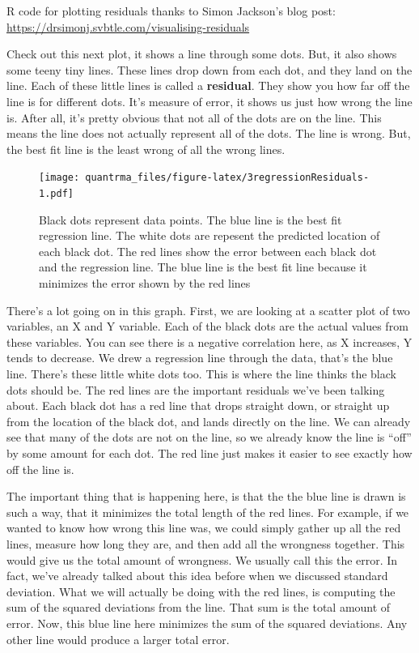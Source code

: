 \documentclass[
]{book}
\begin{document}
\begin{marginnote}

R code for plotting residuals thanks to Simon Jackson's blog post: \url{https://drsimonj.svbtle.com/visualising-residuals}

\end{marginnote}

Check out this next plot, it shows a line through some dots. But, it also shows some teeny tiny lines. These lines drop down from each dot, and they land on the line. Each of these little lines is called a \textbf{residual}. They show you how far off the line is for different dots. It's measure of error, it shows us just how wrong the line is. After all, it's pretty obvious that not all of the dots are on the line. This means the line does not actually represent all of the dots. The line is wrong. But, the best fit line is the least wrong of all the wrong lines.

\begin{figure}
\centering
\texttt{[image: quantrma\_files/figure-latex/3regressionResiduals-1.pdf]}
\caption{\label{fig:3regressionResiduals}Black dots represent data points. The blue line is the best fit regression line. The white dots are repesent the predicted location of each black dot. The red lines show the error between each black dot and the regression line. The blue line is the best fit line because it minimizes the error shown by the red lines}
\end{figure}

There's a lot going on in this graph. First, we are looking at a scatter plot of two variables, an X and Y variable. Each of the black dots are the actual values from these variables. You can see there is a negative correlation here, as X increases, Y tends to decrease. We drew a regression line through the data, that's the blue line. There's these little white dots too. This is where the line thinks the black dots should be. The red lines are the important residuals we've been talking about. Each black dot has a red line that drops straight down, or straight up from the location of the black dot, and lands directly on the line. We can already see that many of the dots are not on the line, so we already know the line is ``off'' by some amount for each dot. The red line just makes it easier to see exactly how off the line is.

The important thing that is happening here, is that the the blue line is drawn is such a way, that it minimizes the total length of the red lines. For example, if we wanted to know how wrong this line was, we could simply gather up all the red lines, measure how long they are, and then add all the wrongness together. This would give us the total amount of wrongness. We usually call this the error. In fact, we've already talked about this idea before when we discussed standard deviation. What we will actually be doing with the red lines, is computing the sum of the squared deviations from the line. That sum is the total amount of error. Now, this blue line here minimizes the sum of the squared deviations. Any other line would produce a larger total error.
\end{document}
